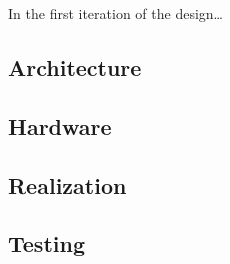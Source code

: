 
\IEEEPARstart
{I}{n} the first iteration of the design\dots

\subsection{Architecture}

\subsection{Hardware}

\subsection{Realization}

\subsection{Testing}
